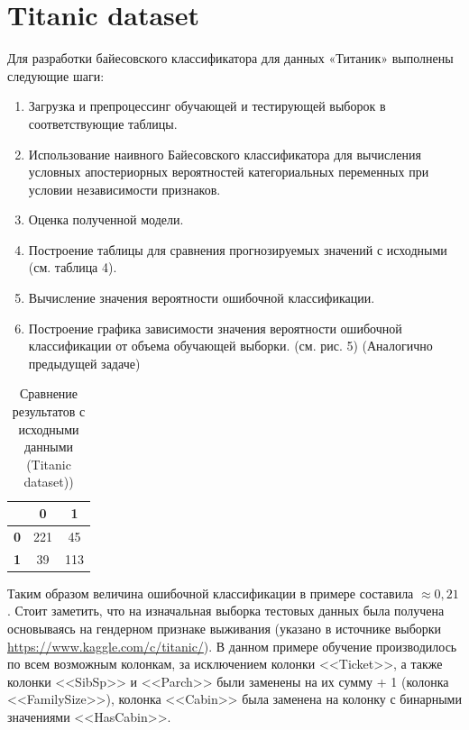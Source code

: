 \documentclass[]{article}
\numberwithin{equation}{section}
\begin{document}
    \section{Titanic dataset}

    Для разработки байесовского классификатора для данных «Титаник» выполнены следующие шаги:

    \begin{enumerate}
        \item Загрузка и препроцессинг обучающей и тестирующей выборок в соответствующие таблицы.
        \item Использование наивного Байесовского классификатора для вычисления условных апостериорных вероятностей категориальных переменных при условии независимости признаков.
        \item Оценка полученной модели.
        \item Построение таблицы для сравнения прогнозируемых значений с исходными (см. таблица 4).
        \item Вычисление значения вероятности ошибочной классификации.
        \item Построение графика зависимости значения вероятности ошибочной классификации от объема обучающей выборки. (см. рис. 5) (Аналогично предыдущей задаче)
    \end{enumerate}

    \begin{table}[H]
        \centering
        \begin{tabular}{|c|c|c|}
          \hline
            & \textbf{0} & \textbf{1} \\
          \hline
          \textbf{0} & 221 & 45\\
          \hline
          \textbf{1} & 39 & 113 \\
          \hline
        \end{tabular}
        \caption{Сравнение результатов с исходными данными (Titanic dataset))}
    \end{table}

    Таким образом величина ошибочной классификации в примере составила $\approx0,21$. Стоит заметить, что на изначальная выборка тестовых данных была получена основываясь на гендерном признаке выживания (указано в источнике выборки \href{https://www.kaggle.com/c/titanic/}{https://www.kaggle.com/c/titanic/}).
    В данном примере обучение производилось по всем возможным колонкам, за исключением колонки <<Ticket>>, а также колонки <<SibSp>> и <<Parch>> были заменены на их сумму + 1 (колонка <<FamilySize>>), колонка <<Cabin>> была заменена на колонку с бинарными значениями <<HasCabin>>.
\end{document}
